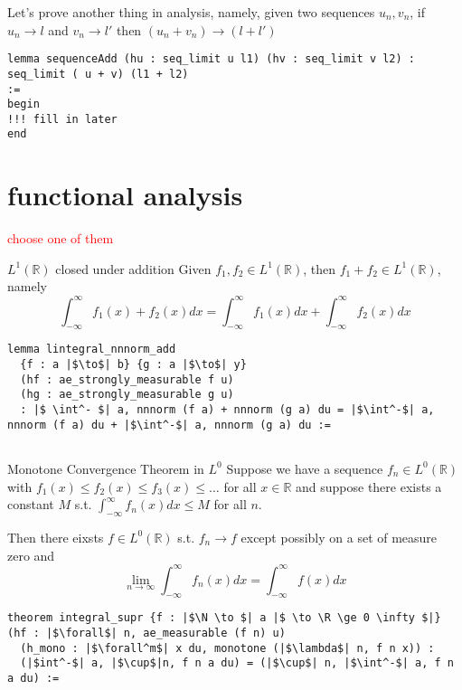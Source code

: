 \documentclass[a4paper]{article}
\newcommand{\R}{\mathbb{R}}
\newcommand{\N}{\mathbb{N}}
\begin{document}
Let's prove another thing in analysis, namely, given two sequences $u_n, v_n$, if $u_n \to l$ and $v_n \to l'$ then $(u_n + v_n) \to (l+l')$

\begin{listing}[!h]
\begin{verbatim}
lemma sequenceAdd (hu : seq_limit u l1) (hv : seq_limit v l2) :
seq_limit ( u + v) (l1 + l2)
:=
begin
!!! fill in later
end
\end{verbatim}
\end{listing}

\section{functional analysis}
\textcolor{red}{choose one of them}

\begin{Theorem}{$L^1(\R)$ closed under addition}{}
	Given $f_1, f_2 \in L^1(\R)$, then $f_1+f_2 \in L^1(\R)$, namely \[
		\int_{-\infty}^{\infty} f_1(x) + f_2(x) dx = \int_{-\infty}^{\infty} f_1(x) dx + \int_{-\infty}^{\infty} f_2(x) dx
	\] 
\end{Theorem}

\begin{listing}[!ht]
\begin{verbatim}
lemma lintegral_nnnorm_add
  {f : a |$\to$| b} {g : a |$\to$| y} 
  (hf : ae_strongly_measurable f u) 
  (hg : ae_strongly_measurable g u) 
  : |$ \int^- $| a, nnnorm (f a) + nnnorm (g a) du = |$\int^-$| a, nnnorm (f a) du + |$\int^-$| a, nnnorm (g a) du :=
	
\end{verbatim}
\end{listing}

\begin{Theorem}{Monotone Convergence Theorem in $L^0$}{}
	Suppose we have a sequence $f_n \in L^0(\R)$ with $f_1(x) \le  f_2(x) \le  f_3(x) \le  \ldots$ for all $x \in \R$ and suppose there exists a constant $M$ s.t.  $\int_{-\infty}^{\infty} f_n(x) dx \le  M$ for all $n$.

	Then there eixsts  $f \in L^0(\R)$ s.t. $f_n \to f$ except possibly on a set of measure zero and \[
		\lim_{n \to \infty} \int_{-\infty}^{\infty} f_n(x) dx = \int_{-\infty}^{\infty} f(x)dx
	\] 
\end{Theorem}

\begin{listing}[!ht]
\begin{verbatim}
theorem integral_supr {f : |$\N \to $| a |$ \to \R \ge 0 \infty $|} 
(hf : |$\forall$| n, ae_measurable (f n) u)
  (h_mono : |$\forall^m$| x du, monotone (|$\lambda$| n, f n x)) :
  (|$int^-$| a, |$\cup$|n, f n a du) = (|$\cup$| n, |$\int^-$| a, f n a du) :=
\end{verbatim}
\end{listing}


\newpage
\printbibliography
\end{document}
